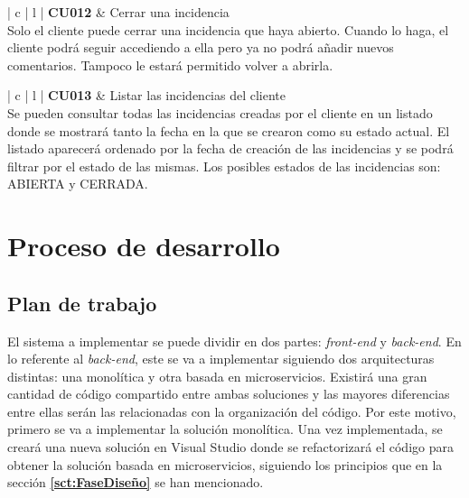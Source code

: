 \documentclass[11pt,spanish,listoffigures]{tfgetsinf}
\begin{document}
\begin{center}
\begin{tabular}{ | c | l | }
\hline
\textbf{ CU012 } & Cerrar una incidencia \\
\hline
{}
{
Solo el cliente puede cerrar una incidencia que haya abierto. Cuando lo haga, el cliente podrá seguir accediendo a ella pero ya no podrá añadir nuevos comentarios. Tampoco le estará permitido volver a abrirla.
} \\
\hline
\end{tabular}
\end{center}

\begin{center}
\begin{tabular}{ | c | l | }
\hline
\textbf{ CU013 } & Listar las incidencias del cliente \\
\hline
{}
{
Se pueden consultar todas las incidencias creadas por el cliente en un listado donde se mostrará tanto la fecha en la que se crearon como su estado actual. El listado aparecerá ordenado por la fecha de creación de las incidencias y se podrá filtrar por el estado de las mismas. Los posibles estados de las incidencias son: ABIERTA y CERRADA.
} \\
\hline
\end{tabular}
\end{center}

%

\chapter{Proceso de desarrollo}

\section{Plan de trabajo} \label{sct:PlanTrabajo}

El sistema a implementar se puede dividir en dos partes: \textit{front-end} y \textit{back-end}. En lo referente al \textit{back-end}, este se va a implementar siguiendo dos arquitecturas distintas: una monolítica y otra basada en microservicios. Existirá una gran cantidad de código compartido entre ambas soluciones y las mayores diferencias entre ellas serán las relacionadas con la organización del código. Por este motivo, primero se va a implementar la solución monolítica. Una vez implementada, se creará una nueva solución en Visual Studio donde se refactorizará el código para obtener la solución basada en microservicios, siguiendo los principios que en la sección \textbf{\ref{sct:FaseDiseño} } se han mencionado.
\end{document}

